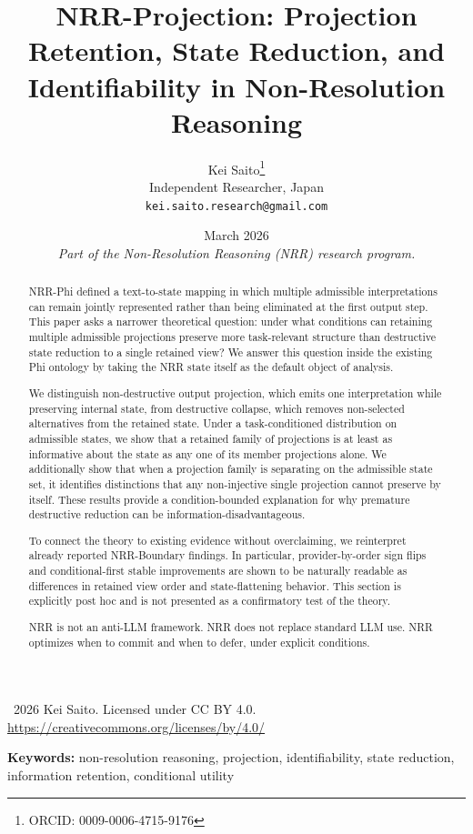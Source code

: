 \documentclass[11pt,a4paper]{article}
\title{\textbf{NRR-Projection: Projection Retention, State Reduction, and Identifiability in Non-Resolution Reasoning}}
\author{
  Kei Saito\thanks{ORCID: 0009-0006-4715-9176} \\
  Independent Researcher, Japan \\
  \texttt{kei.saito.research@gmail.com}
}
\date{March 2026 \\[0.5em]
\textit{Part of the Non-Resolution Reasoning (NRR) research program.}}
\begin{document}
\maketitle

\begin{center}
\textcopyright\ 2026 Kei Saito.
Licensed under CC BY 4.0.\\
\url{https://creativecommons.org/licenses/by/4.0/}
\end{center}

\begin{abstract}
NRR-Phi defined a text-to-state mapping in which multiple admissible interpretations can remain jointly represented rather than being eliminated at the first output step. This paper asks a narrower theoretical question: under what conditions can retaining multiple admissible projections preserve more task-relevant structure than destructive state reduction to a single retained view? We answer this question inside the existing Phi ontology by taking the NRR state itself as the default object of analysis.

We distinguish non-destructive output projection, which emits one interpretation while preserving internal state, from destructive collapse, which removes non-selected alternatives from the retained state. Under a task-conditioned distribution on admissible states, we show that a retained family of projections is at least as informative about the state as any one of its member projections alone. We additionally show that when a projection family is separating on the admissible state set, it identifies distinctions that any non-injective single projection cannot preserve by itself. These results provide a condition-bounded explanation for why premature destructive reduction can be information-disadvantageous.

To connect the theory to existing evidence without overclaiming, we reinterpret already reported NRR-Boundary findings. In particular, provider-by-order sign flips and conditional-first stable improvements are shown to be naturally readable as differences in retained view order and state-flattening behavior. This section is explicitly post hoc and is not presented as a confirmatory test of the theory.

NRR is not an anti-LLM framework. NRR does not replace standard LLM use. NRR optimizes when to commit and when to defer, under explicit conditions.
\end{abstract}

\noindent\textbf{Keywords:} non-resolution reasoning, projection, identifiability, state reduction, information retention, conditional utility
\end{document}
